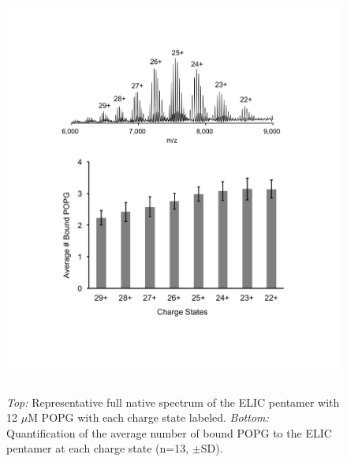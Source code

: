 \documentclass[12pt]{ruthesis_nofloat}
\begin{document}
\begin{figure}

\includegraphics[width=4.64167in,height=5.34307in]{./pandoc_test/media/image13.pdf}

\caption[Comparison of lipid binding at different
charge states.] {\emph{Top:} Representative full native spectrum of the
ELIC pentamer with 12 $\mu$M POPG with each charge state labeled.
\emph{Bottom:} Quantification of the average number of bound POPG to the
ELIC pentamer at each charge state (n=13, $\pm$SD).} \label{fig:Supplementary Fig. 3}
\end{figure}

\renewcommand{\thefigure}{C4}
\end{document}
